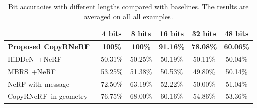 \documentclass[10pt,twocolumn,letterpaper]{article}
\def\CopyNeRF{CopyRNeRF~}
\begin{document}
\begin{table}[!htb]
 \caption{Bit accuracies with different lengths compared with baselines. The results are averaged on all all examples.}
 \label{tab:comparison1}
 \centering
 \begin{tabular}{l|ccccc}
    \toprule
         & 4 bits & 8 bits & 16 bits & 32 bits & 48 bits \\
    \midrule
    \textbf{Proposed \CopyNeRF} &\textbf{100\%} & \textbf{100\%}  & \textbf{91.16\%} & \textbf{78.08\%}  & \textbf{60.06\%}   \\
    HiDDeN~\cite{zhang2020udh}+NeRF\cite{nerf2020} & 50.31\% & 50.25\% & 50.19\% & 50.11\% & 50.04\%      \\
    MBRS~\cite{jia2021mbrs}+NeRF~\cite{nerf2020} & 53.25\% & 51.38\% & 50.53\% & 49.80\% & 50.14\%      \\
    NeRF\cite{nerf2020} with message & 72.50\%  & 63.19\% &52.22\%  & 50.00\% & 51.04\%\\
    \CopyNeRF in geometry &   76.75\% & 68.00\% &60.16\%  & 54.86\% & 53.36\%\\
    \bottomrule
\end{tabular}
\vspace{-5pt}
\label{tab:bavsdl}
\end{table}
\end{document}
